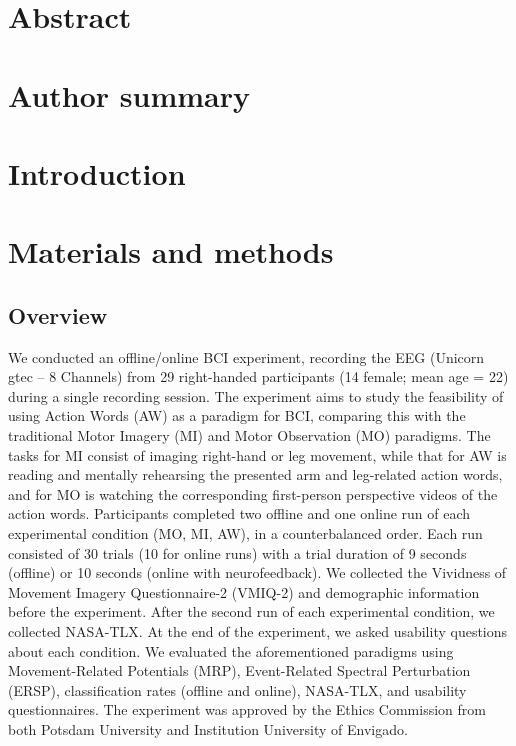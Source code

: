 \documentclass[10pt,letterpaper]{article}
\begin{document}
\section*{Abstract}


\section*{Author summary}

\linenumbers

\section*{Introduction}

\section*{Materials and methods}

\subsection*{Overview}


We conducted an offline/online BCI experiment, recording the EEG (Unicorn gtec – 8 Channels) from 29 right-handed participants (14 female; mean age = 22) during a single recording session. The experiment aims to study the feasibility of using Action Words (AW) as a paradigm for BCI, comparing this with the traditional Motor Imagery (MI) and Motor Observation (MO) paradigms. The tasks for MI consist of imaging right-hand or leg movement, while that for AW is reading and mentally rehearsing the presented arm and leg-related action words, and for MO is watching the corresponding first-person perspective videos of the action words. Participants completed two offline and one online run of each experimental condition (MO, MI, AW), in a counterbalanced order. Each run consisted of 30 trials (10 for online runs) with a trial duration of 9 seconds (offline) or 10 seconds (online with neurofeedback). We collected the Vividness of Movement Imagery Questionnaire-2 (VMIQ-2) and demographic information before the experiment. After the second run of each experimental condition, we collected NASA-TLX. At the end of the experiment, we asked usability questions about each condition. We evaluated the aforementioned paradigms using  Movement-Related Potentials (MRP), Event-Related Spectral Perturbation (ERSP), classification rates (offline and online), NASA-TLX, and usability questionnaires. The experiment was approved by the Ethics Commission from both Potsdam University and Institution University of Envigado.
\end{document}
